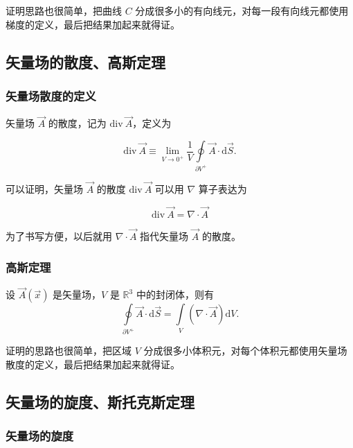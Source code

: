 证明思路也很简单，把曲线 $C $ 分成很多小的有向线元，对每一段有向线元都使用梯度的定义，最后把结果加起来就得证。

\subsection{矢量场的散度、高斯定理}

\subsubsection{矢量场散度的定义}

矢量场 $\vec{A} $ 的散度，记为 $\mathrm{div}~\vec{A} $，定义为

\begin{equation}
\mathrm{div}~\vec{A}
\equiv \lim_{V\to 0^+} \frac{1 }{V } \oint\limits_{\partial V^+} \vec{A}\cdot\mathrm{d}\vec{S}.
\end{equation}

可以证明，矢量场 $\vec{A} $ 的散度 $\mathrm{div}~\vec{A} $ 可以用 $\nabla $ 算子表达为

\begin{equation}
\mathrm{div}~\vec{A}
=\nabla \cdot \vec{A}
\end{equation}

为了书写方便，以后就用 $\nabla \cdot \vec{A} $ 指代矢量场 $\vec{A} $ 的散度。

\subsubsection{高斯定理}

\begin{theorem}
设 $\vec{A}(\vec{x}) $ 是矢量场，$V $ 是 $\mathbb{R}^3 $ 中的封闭体，则有
\begin{equation}
\oint\limits_{\partial V^+} \vec{A}\cdot\mathrm{d}\vec{S}
=\int\limits_{V} \left(\nabla\cdot\vec{A}\right)\mathrm{d}V.
\end{equation}
\end{theorem}

证明的思路也很简单，把区域 $V $ 分成很多小体积元，对每个体积元都使用矢量场散度的定义，最后把结果加起来就得证。

\subsection{矢量场的旋度、斯托克斯定理}

\subsubsection{矢量场的旋度}

